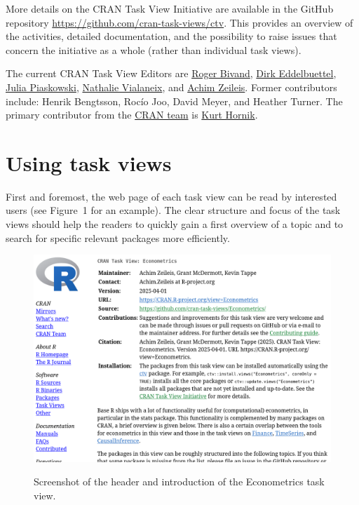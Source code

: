 More details on the CRAN Task View Initiative are available in the GitHub repository
\url{https://github.com/cran-task-views/ctv}. This provides an overview of the activities,
detailed documentation, and the possibility to raise issues that concern the initiative
as a whole (rather than individual task views).

The current CRAN Task View Editors are
\href{https://github.com/rsbivand}{Roger Bivand},
\href{https://github.com/eddelbuettel}{Dirk Eddelbuettel},
\href{https://github.com/jpiaskowski}{Julia Piaskowski},
\href{https://github.com/tuxette}{Nathalie Vialaneix}, and
\href{https://github.com/zeileis}{Achim Zeileis}.
Former contributors include: Henrik Bengtsson, Rocío Joo, David Meyer, and Heather Turner.
The primary contributor from the \href{https://CRAN.R-project.org/CRAN_team.htm}{CRAN team} is
\href{https://github.com/kurthornik}{Kurt Hornik}.

\section{Using task views}\label{using-task-views}

First and foremost, the web page of each task view can be read by interested users
(see Figure~1 for an example).
The clear structure and focus of the task views should help the readers to quickly
gain a first overview of a topic and to search for specific relevant packages
more efficiently.

\begin{figure}[t!]
\includegraphics[width=1\linewidth,alt={Screenshot of the header and introduction of the Econometrics task view, captured on 2025-04-01 at https://CRAN.R-project.org/view=Econometrics. The header displays the title (Econometrics), maintainers (Achim Zeileis, Grant McDermott, Kevin Tappe), contact e-mail address, version/date, URL, GitHub link, information for potential contributors, the recommended citation, and installation instructions. The introduction starts by outlining the scope and links to other related task views (Finance, TimeSeries, CausalInference).}]{figures/econometrics} \caption{Screenshot of the header and introduction of the Econometrics task view.}\label{fig:econometrics}
\end{figure}

